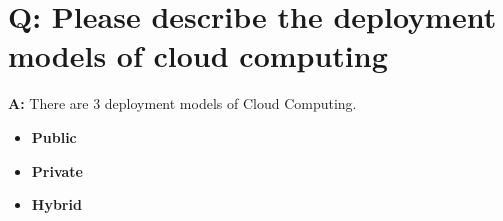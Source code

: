 \documentclass[a4paper]{article}
\begin{document}
\vspace{5mm} 

\section{ Q: Please describe the deployment models of cloud computing}

\hspace{1cm}\textbf{A:} There are 3 deployment models of Cloud Computing.
\begin{itemize}
\item \textbf{Public}

\item \textbf{Private}

\item \textbf{Hybrid}

\end{itemize}
\end{document}
